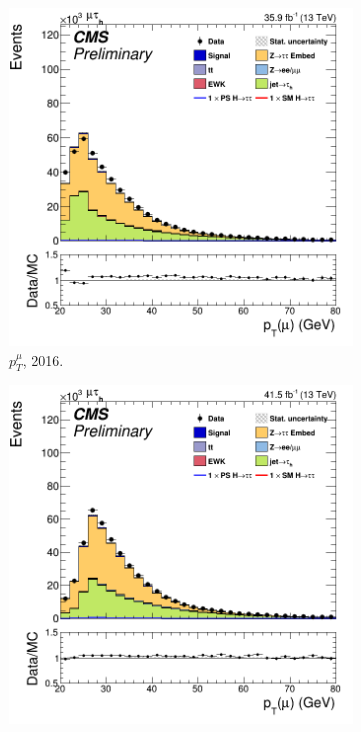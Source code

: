 \begin{figure}
  \begin{subfigure}[b]{0.33\linewidth}
    \centering
    \includegraphics[width=\linewidth]{Chapitre7/Images/CtrlPlots/2016/MuonpT.png} 
    \caption{$p^{\mu}_T$, 2016.} 
    \vspace{0.5ex}
  \end{subfigure}%
  \begin{subfigure}[b]{0.33\linewidth}
    \centering
    \includegraphics[width=\linewidth]{Chapitre7/Images/CtrlPlots/2017/MuonpT.png} 

\end{subfigure}
\end{figure}
